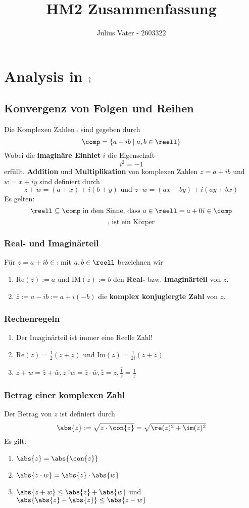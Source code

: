 \documentclass{kit}
\author{Julius Vater - 2603322}
\title{HM2 Zusammenfassung}
\begin{document}
\maketitle
\tableofcontents
\pagebreak
\setcounter{section}{11}
\section{Analysis in \texorpdfstring{$\comp$}{}}
  \subsection{Konvergenz von Folgen und Reihen}
    Die Komplexen Zahlen $\comp$ sind gegeben durch
    $$\comp=\{a+ib\mid a,b\in\reell\}$$
    Wobei die \textbf{imaginäre Einhiet} $i$ die Eigenschaft
    $$i^2=-1$$
    erfüllt. \textbf{Addition} und \textbf{Multiplikation} von komplexen Zahlen $z=a+ib$ und $w=x+iy$ sind definiert durch
    $$z+w=(a+x)+i(b+y)\text{ und }z\cdot w=(ax-by)+i(ay+bx)$$
    Es gelten:
    $$\reell\subseteq\comp\text{ in dem Sinne, dass }a\in\reell=a+0i\in\comp$$
    $$\comp\text{ ist ein Körper}$$
    \subsubsection{Real- und Imaginärteil}
      Für $z=a+ib\in\comp$ mit $a,b\in\reell$ bezeichnen wir
      \begin{enumerate}
        \item Re$(z):=a$ und IM$(z):=b$ den \textbf{Real-} bzw. \textbf{Imaginärteil} von $z$.
        \item $\bar z:=a-ib:=a+i(-b)$ die \textbf{komplex konjugiergte Zahl} von $z$.
      \end{enumerate}
    \subsubsection{Rechenregeln}
      \begin{enumerate}
        \item Der Imaginärteil ist immer eine Reelle Zahl!
        \item Re$(z)=\frac{1}{2}(z+\bar z)$ und Im$(z)=\frac{1}{2i}(z+\bar z)$
        \item $\overline{z+w}=\bar z+\bar w,\overline{z\cdot w}=\bar z\cdot\bar w, \bar\bar z=z, 
          \overline{\frac{1}{z}}=\frac{1}{\bar z}$
      \end{enumerate}
    \subsubsection{Betrag einer komplexen Zahl}
      Der Betrag von $z$ ist definiert durch
      $$\abs{z}:=\sqrt{z\cdot\con{z}}=\sqrt{\re(z)^2+\im(z)^2}$$
      Es gilt:
      \begin{enumerate}
        \item $\abs{z}=\abs{\con{z}}$
        \item $\abs{z\cdot w}=\abs{z}\cdot\abs{w}$
        \item $\abs{z+w}\le\abs{z}+\abs{w}$ und $\abs{\abs{z}-\abs{z}}\le\abs{z-w}$
      \end{enumerate}
\end{document}
